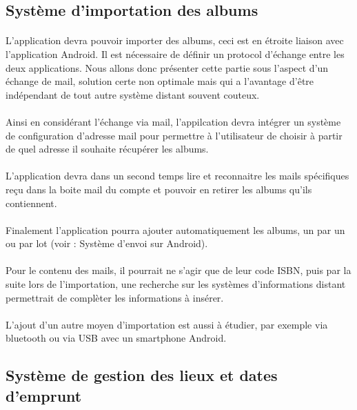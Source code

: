 \subsection{Système d'importation des albums}
\paragraph{}
L'application devra pouvoir importer des albums, ceci est en étroite liaison avec l'application Android. Il est nécessaire de définir un protocol d'échange entre les deux applications. Nous allons donc présenter cette partie sous l'aspect d'un échange de mail, solution certe non optimale mais qui a l'avantage d'être indépendant de tout autre système distant souvent couteux.
\paragraph{}  
Ainsi en considérant l'échange via mail, l'appilcation devra intégrer un système de configuration d'adresse mail pour permettre à l'utilisateur de choisir à partir de quel adresse il souhaite récupérer les albums.
\paragraph{}  
L'application devra dans un second temps lire et reconnaitre les mails spécifiques reçu dans la boite mail du compte et pouvoir en retirer les albums qu'ils contiennent.
\paragraph{}  
Finalement l'application pourra ajouter automatiquement les albums, un par un ou par lot (voir : Système d'envoi sur Android).
\paragraph{}  
Pour le contenu des mails, il pourrait ne s'agir que de leur code ISBN, puis par la suite lors de l'importation, une recherche sur les systèmes d'informations distant permettrait de complèter les informations à insérer.
\paragraph{}  
L'ajout d'un autre moyen d'importation est aussi à étudier, par exemple via bluetooth ou via USB avec un smartphone Android.

\subsection{Système de gestion des lieux et dates d'emprunt}
